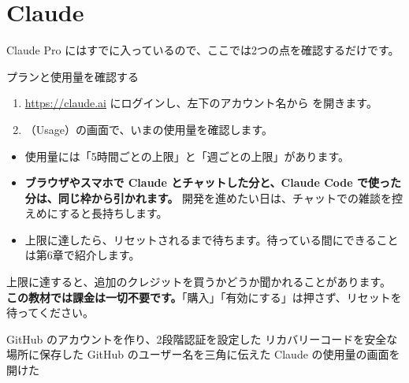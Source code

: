 \section{Claude}

Claude Pro にはすでに入っているので、ここでは2つの点を確認するだけです。

\begin{step}{プランと使用量を確認する}
\begin{enumerate}
  \item \url{https://claude.ai} にログインし、左下のアカウント名から  を開きます。
  \item {}（Usage）の画面で、いまの使用量を確認します。
\end{enumerate}
\end{step}

\begin{tip}
\begin{itemize}
  \item 使用量には「5時間ごとの上限」と「週ごとの上限」があります。
  \item \textbf{ブラウザやスマホで Claude とチャットした分と、Claude Code で使った分は、同じ枠から引かれます。}
        開発を進めたい日は、チャットでの雑談を控えめにすると長持ちします。
  \item 上限に達したら、リセットされるまで待ちます。待っている間にできることは第6章で紹介します。
\end{itemize}
\end{tip}

\begin{caution}[追加の課金は押さない]
上限に達すると、追加のクレジットを買うかどうか聞かれることがあります。
\textbf{この教材では課金は一切不要です。}「購入」「有効にする」は押さず、リセットを待ってください。
\end{caution}

\begin{checklist}
\begin{itemize}
  \checkitem GitHub のアカウントを作り、2段階認証を設定した
  \checkitem リカバリーコードを安全な場所に保存した
  \checkitem GitHub のユーザー名を三角に伝えた
  \checkitem Claude の使用量の画面を開けた
\end{itemize}
\end{checklist}
